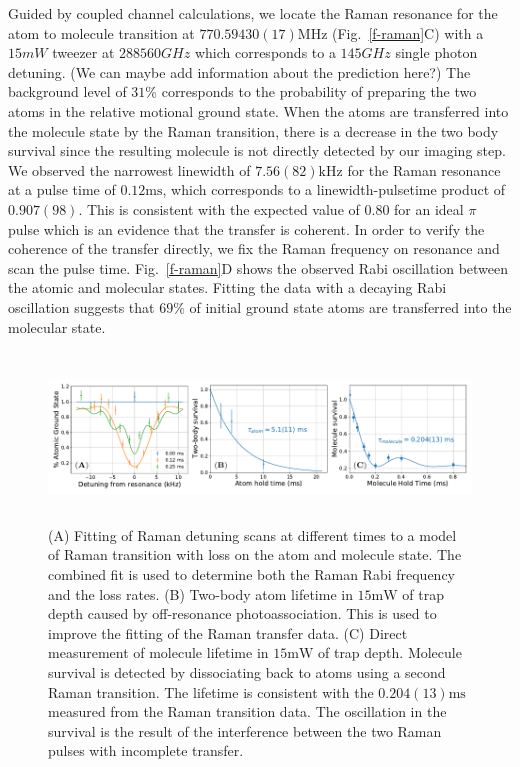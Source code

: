 \documentclass[aps,prl,twocolumn,groupedaddress]{revtex4-1}
\newcommand{\todo}[1]{}
\begin{document}
Guided by coupled channel calculations, we locate the Raman resonance for the atom to molecule transition at $770.59430(17) \mathrm{MHz}$ (Fig.~\ref{f-raman}C) with a $15 mW$ tweezer at $288560 GHz$ which corresponds to a $145 GHz$ single photon detuning. (We can maybe add information about the prediction here?)
The background level of $31\%$ corresponds to the probability of preparing the two atoms in the relative motional ground state. When the atoms are transferred into the molecule state by the Raman transition, there is a decrease in the two body survival since the resulting molecule is not directly detected by our imaging step.
We observed the narrowest linewidth of $7.56(82) \mathrm{kHz}$ for the Raman resonance at a pulse time of $0.12 \mathrm{ms}$, which corresponds to a linewidth-pulsetime product of $0.907(98)$. This is consistent with the expected value of $0.80$ for an ideal $\pi$ pulse which is an evidence that the transfer is coherent. In order to verify the coherence of the transfer directly, we fix the Raman frequency on resonance and scan the pulse time. Fig.~\ref{f-raman}D shows the observed Rabi oscillation between the atomic and molecular states. Fitting the data with a decaying Rabi oscillation suggests that $69\%$ of initial ground state atoms are transferred into the molecular state.


\begin{figure}
  \includegraphics[height=4.5cm]{fig3.pdf}
  \caption{
    (A) Fitting of Raman detuning scans at different times to a model of Raman transition
    with loss on the atom and molecule state. The combined fit is used to determine
    both the Raman Rabi frequency and the loss rates.
    (B) \todo{inset?} Two-body atom lifetime in $15 \mathrm{mW}$ of trap depth caused by
    off-resonance photoassociation.
    This is used to improve the fitting of the Raman transfer data.
    (C) Direct measurement of molecule lifetime in $15 \mathrm{mW}$ of trap depth.
    Molecule survival is detected by dissociating back to atoms using a second Raman transition.
    The lifetime is consistent with the $0.204(13) \mathrm{ms}$
    measured from the Raman transition data.
    The oscillation in the survival is the result of the interference
    between the two Raman pulses with incomplete transfer.
    \label{f-lifetime}}
\end{figure}
\end{document}
